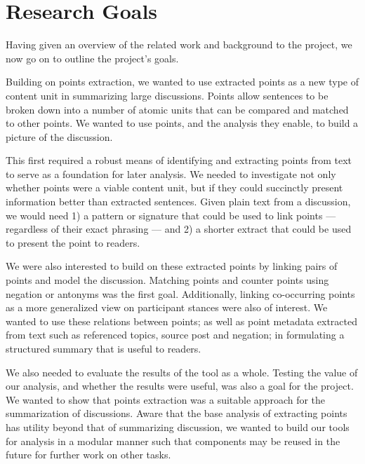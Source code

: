 \chapter{Research Goals\label{chap:res-goals}}
  Having given an overview of the related work and background to the project, we now go on to outline the project's goals.

  Building on points extraction, we wanted to use extracted points as a new type of content unit in summarizing large discussions. Points allow sentences to be broken down into a number of atomic units that can be compared and matched to other points. We wanted to use points, and the analysis they enable, to build a picture of the discussion.

  This first required a robust means of identifying and extracting points from text to serve as a foundation for later analysis. We needed to investigate not only whether points were a viable content unit, but if they could succinctly present information better than extracted sentences. Given plain text from a discussion, we would need 1) a pattern or signature that could be used to link points --- regardless of their exact phrasing --- and 2) a shorter extract that could be used to present the point to readers.

  We were also interested to build on these extracted points by linking pairs of points and model the discussion. Matching points and counter points using negation or antonyms was the first goal. Additionally, linking co-occurring points as a more generalized view on participant stances were also of interest. We wanted to use these relations between points; as well as point metadata extracted from text such as referenced topics, source post and negation; in formulating a structured summary that is useful to readers.

  We also needed to evaluate the results of the tool as a whole. Testing the value of our analysis, and whether the results were useful, was also a goal for the project. We wanted to show that points extraction was a suitable approach for the summarization of discussions. Aware that the base analysis of extracting points has utility beyond that of summarizing discussion, we wanted to build our tools for analysis in a modular manner such that components may be reused in the future for further work on other tasks.
